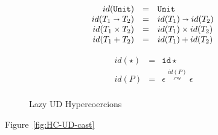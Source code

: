 \documentclass[acmsmall,review,anonymous]{acmart}\settopmatter{printfolios=true,printccs=false,printacmref=false}
\newcommand{\funrule}[3]{#1 &=& #2 & #3\\}
\newcommand{\plus}[0]{+}
\newcommand{\POOunit}[0]{\mathtt{Unit}}
\newcommand{\POOfun}[2]{#1 \shortrightarrow #2}
\newcommand{\POOprod}[2]{#1 \times #2}
\newcommand{\POOsum}[2]{#1 \plus #2}
\newcommand{\hyperCoercionI}[0]{\mathtt{id\star}}
\newcommand{\hyperCoercionC}[3]{#1 \overset{#2}{\curvearrowright} #3}
\begin{document}
\begin{figure}
  \[
  \begin{array}{rclr}
    \funrule{id(\POOunit)}{\POOunit}{}
    \funrule{id(\POOfun{T_1}{T_2})}{
		\POOfun{id(T_1)}{id(T_2)}
    }{}
    \funrule{id(\POOprod{T_1}{T_2})}{
		\POOprod{id(T_1)}{id(T_2)}
    }{}
    \funrule{id(\POOsum{T_1}{T_2})}{
		\POOsum{id(T_1)}{id(T_2)}
    }{}
  \end{array}
  \]
  
  \[
  \begin{array}{rclr}
    \funrule{id(\star)}{
		\hyperCoercionI
    }{}
    \funrule{id(P)}{
		\hyperCoercionC{\epsilon}{id(P)}{\epsilon}
    }{}
  \end{array}
  \]

  
  \caption{Lazy UD Hypercoercions}
  \label{fig:HC-UD}
\end{figure}


Figure~\ref{fig:HC-UD-cast}
\end{document}
